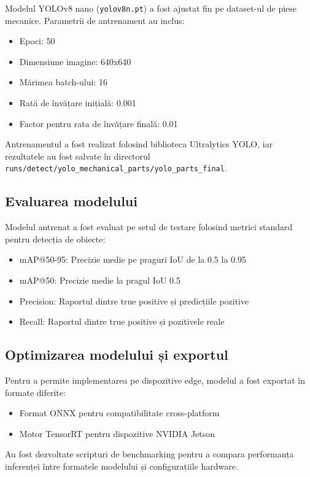 \documentclass[12pt,a4paper]{article}
\begin{document}
Modelul YOLOv8 nano (\texttt{yolov8n.pt}) a fost ajustat fin pe dataset-ul de piese mecanice. Parametrii de antrenament au inclus:
\begin{itemize}
\item Epoci: 50
\item Dimensiune imagine: 640x640
\item Mărimea batch-ului: 16
\item Rată de învățare inițială: 0.001
\item Factor pentru rata de învățare finală: 0.01
\end{itemize}

Antrenamentul a fost realizat folosind biblioteca Ultralytics YOLO, iar rezultatele au fost salvate în directorul \texttt{runs/detect/yolo\_mechanical\_parts/yolo\_parts\_final}.

\subsection{Evaluarea modelului}

Modelul antrenat a fost evaluat pe setul de testare folosind metrici standard pentru detecția de obiecte:
\begin{itemize}
\item mAP@50-95: Precizie medie pe praguri IoU de la 0.5 la 0.95
\item mAP@50: Precizie medie la pragul IoU 0.5
\item Precision: Raportul dintre true positive și predicțiile pozitive
\item Recall: Raportul dintre true positive și pozitivele reale
\end{itemize}

\subsection{Optimizarea modelului și exportul}

Pentru a permite implementarea pe dispozitive edge, modelul a fost exportat în formate diferite:
\begin{itemize}
\item Format ONNX pentru compatibilitate cross-platform
\item Motor TensorRT pentru dispozitive NVIDIA Jetson
\end{itemize}

Au fost dezvoltate scripturi de benchmarking pentru a compara performanța inferenței între formatele modelului și configurațiile hardware.
\end{document}
